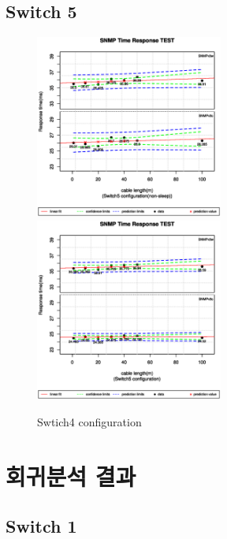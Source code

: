 \documentclass[11pt
  , a4paper
  , article
  , oneside
]{memoir}
\begin{document}
\section{Switch 5}
 \begin{figure}[!htb]
  \centering
  \includegraphics[width=0.55\textwidth]{./images/s5sx.eps}
  \includegraphics[width=0.55\textwidth]{./images/s5s1.eps}
  \caption{Swtich4 configuration} 
\end{figure}

\chapter{회귀분석 결과}\label{cha:result}
\section{Switch 1}
\end{document}

